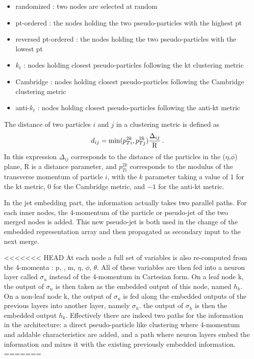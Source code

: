 \begin{itemize}
    \item randomized : two nodes are selected at random
    \item pt-ordered : the nodes holding the two pseudo-particles with the highest pt 
    \item reversed pt-ordered : the nodes holding the two pseudo-particles with the lowest pt
    \item $k_t$ : nodes holding closest pseudo-particles following the kt clustering metric
    \item Cambridge : nodes holding closest pseudo-particles following the Cambridge clustering metric
    \item anti-$k_t$ : nodes holding closest pseudo-particles following the anti-kt metric
\end{itemize}
The distance of two particles $i$ and $j$ in a clustering metric is defined as
\begin{equation}
    d_{ij} = \mathrm{min}(p_{Ti}^{2k},p_{Tj}^{2k}) \frac{\Delta_{ij}}{\mathrm{R}} \mend
\end{equation}
In this expression $\Delta_{ij}$ corresponds to the distance of the particles in the ($\eta$,$\phi$) plane, R is a distance parameter, and $p_{Ti}^{2k}$ corresponds to the modulus of the transverse momentum of particle $i$, with the $k$ parameter taking a value of 1 for the kt metric, 0 for the Cambridge metric, and $-1$ for the anti-kt metric.

In the jet embedding part, the information actually takes two parallel paths. For each inner nodes, the 4-momentum of the particle or pseudo-jet of the two merged nodes is added. This new pseudo-jet is both used in the change of the embedded representation array and then propagated as secondary input to the next merge.

<<<<<<< HEAD
At each node a full set of variables is also re-computed from the 4-momenta : p, \pt, m, $\eta$, $\phi$, $\theta$. All of these variables are then fed into a neuron layer called $\sigma_{u}$ instead of the 4-momentum in Cartesian form.
On a leaf node k, the output of $\sigma_{u}$ is then taken as the embedded output of this node, named $h_k$.
On a non-leaf node k, the output of $\sigma_{u}$ is fed along the embedded outputs of the previous layers into another layer, namely $\sigma_h$. the output of $\sigma_h$ is then the embedded output $h_k$.
Effectively there are indeed two paths for the information in the architecture: a direct pseudo-particle like clustering where 4-momentum and addable characteristics are added, and a path where neuron layers embed the information and mixes it with the existing previously embedded information.
=======
